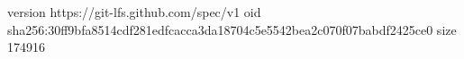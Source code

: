 version https://git-lfs.github.com/spec/v1
oid sha256:30ff9bfa8514cdf281edfcacca3da18704c5e5542bea2c070f07babdf2425ce0
size 174916

